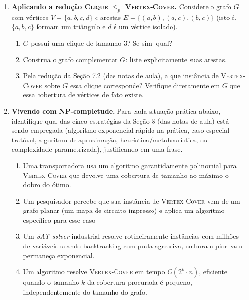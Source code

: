 \documentclass[11pt,a4paper]{extarticle}
\begin{document}
\begin{enumerate}[label=\textbf{\arabic*.}]
\item \textbf{Aplicando a redução \textsc{Clique} $\leq_p$ \textsc{Vertex-Cover}.} Considere o grafo $G$ com vértices $V = \{a, b, c, d\}$ e arestas $E = \{(a,b), (a,c), (b,c)\}$ (isto é, $\{a,b,c\}$ formam um triângulo e $d$ é um vértice isolado).
\begin{enumerate}[label=(\alph*)]
  \item $G$ possui uma clique de tamanho $3$? Se sim, qual?
  \item Construa o grafo complementar $\bar{G}$: liste explicitamente suas arestas.
  \item Pela redução da Seção 7.2 (das notas de aula), a que instância de \textsc{Vertex-Cover} sobre $\bar{G}$ essa clique corresponde? Verifique diretamente em $\bar{G}$ que essa cobertura de vértices de fato existe.
\end{enumerate}

\item \textbf{Vivendo com NP-completude.} Para cada situação prática abaixo, identifique qual das cinco estratégias da Seção 8 (das notas de aula) está sendo empregada (algoritmo exponencial rápido na prática, caso especial tratável, algoritmo de aproximação, heurística/metaheurística, ou complexidade parametrizada), justificando em uma frase.
\begin{enumerate}[label=(\alph*)]
  \item Uma transportadora usa um algoritmo garantidamente polinomial para \textsc{Vertex-Cover} que devolve uma cobertura de tamanho no máximo o dobro do ótimo.
  \item Um pesquisador percebe que sua instância de \textsc{Vertex-Cover} vem de um grafo planar (um mapa de circuito impresso) e aplica um algoritmo específico para esse caso.
  \item Um \emph{SAT solver} industrial resolve rotineiramente instâncias com milhões de variáveis usando backtracking com poda agressiva, embora o pior caso permaneça exponencial.
  \item Um algoritmo resolve \textsc{Vertex-Cover} em tempo $O(2^k \cdot n)$, eficiente quando o tamanho $k$ da cobertura procurada é pequeno, independentemente do tamanho do grafo.
\end{enumerate}

\end{enumerate}

\end{document}
